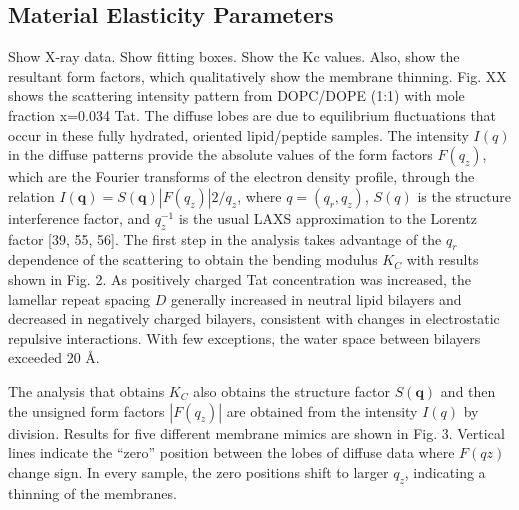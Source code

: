 \subsection{Material Elasticity Parameters}
Show X-ray data. Show fitting boxes.
Show the Kc values.
Also, show the resultant
form factors, which qualitatively show the membrane thinning.
Fig. XX shows the scattering intensity pattern from DOPC/DOPE (1:1) with mole 
fraction
x=0.034 Tat. The diffuse lobes are due to equilibrium fluctuations that occur 
in these fully
hydrated, oriented lipid/peptide samples. The intensity $I(q)$ in the diffuse 
patterns provide the
absolute values of the form factors $F(q_z)$, which are the Fourier transforms 
of the electron density
profile, through the relation $I(\mathbf{q})=S(\mathbf{q})|F(q_z)|2/q_z$, 
where $q=(q_r,q_z)$, $S(q)$ is 
the structure
interference factor, and $q_z^{−1}$ is the usual LAXS approximation to the 
Lorentz factor [39, 55, 56].
The first step in the analysis takes advantage of the $q_r$ dependence of the 
scattering to obtain the
bending modulus $K_C$ with results shown in Fig. 2. As positively charged Tat 
concentration was
increased, the lamellar repeat spacing $D$ generally increased in neutral lipid 
bilayers and
decreased in negatively charged bilayers, consistent with changes in 
electrostatic repulsive
interactions. With few exceptions, the water space between bilayers exceeded 
20 \AA.

The analysis that obtains $K_C$ also obtains the structure factor $S(\mathbf{q})$ 
and then the unsigned
form factors $|F(q_z)|$ are obtained from the intensity $I(q)$ by division. 
Results for five different
membrane mimics are shown in Fig. 3. Vertical lines indicate the “zero” position 
between the
lobes of diffuse data where $F(qz)$ change sign. In every sample, the zero 
positions shift to larger
$q_z$, indicating a thinning of the membranes.

